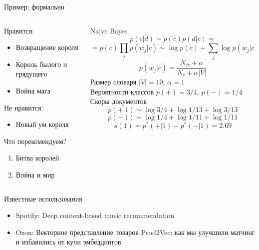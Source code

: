 \documentclass[11pt,aspectratio=169]{beamer}
\begin{document}
\begin{frame}{Пример: формально}

\begin{columns}

\begin{column}{0.47\textwidth} 

Нравится:
\begin{itemize}
\item Возвращение короля
\item Король былого и грядущего
\item Война мага
\end{itemize}

Не нравится:
\begin{itemize}
\item Новый ум короля
\end{itemize}

Что порекомендуем?
\begin{enumerate}
\item Битва королей
\item Война и мир
\end{enumerate}

\end{column}

\begin{column}{0.47\textwidth}
\begin{footnotesize}
Naive Bayes
\[
p(c | d) \sim p(c) p(d | c) = 
\]
\[
= p(c) \prod_j p(w_j | c) \sim \log p(c) + \sum_j \log p(w_j | c)
\]
\[
p(w_j | c) = \frac{N_{jc} + \alpha}{N_c + \alpha |V|}
\]
Размер словаря $|V| = 10$, $\alpha = 1$ \\
Вероятности классов $p(+) = 3/4$, $p(-) = 1/4$
Скоры документов
\[
p(+|1) \sim \log 3/4 + \log 1 / 13 + \log 3 / 13
\]
\[
p(-|1) \sim \log 1/4 + \log 1 / 11 + \log 1 / 11
\]
\[
s(1) = p^*(+|1)  - p^*(-|1) = 2.69
\]
\end{footnotesize}
\end{column}

\end{columns}

\end{frame}

\begin{frame}{Известные использования}

\begin{itemize}
\item Spotify: Deep content-based music recommendation \cite{SPOTIFY}
\item Ozon: Векторное представление товаров Prod2Vec: как мы улучшили матчинг и избавились от кучи эмбеддингов \cite{OZON}
\end{itemize}

\end{frame}
\end{document}
